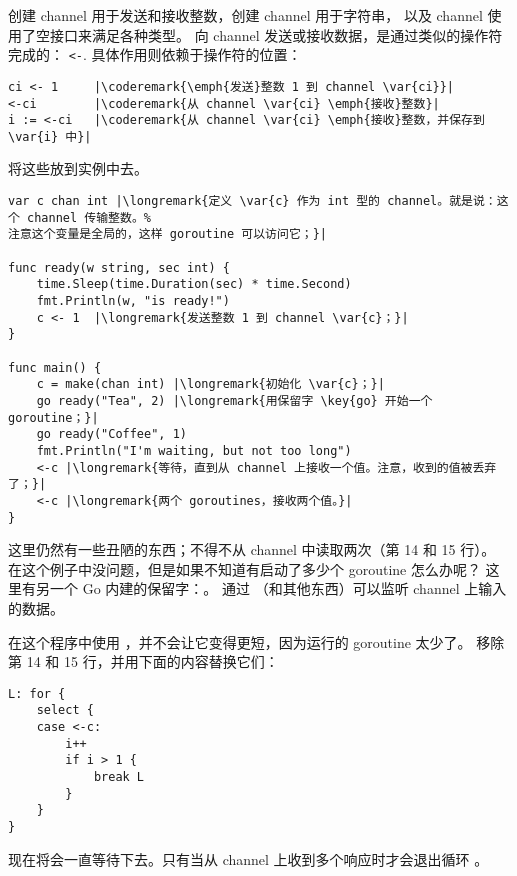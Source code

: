 创建 channel  用于发送和接收整数，创建 channel  用于字符串，
以及 channel  使用了空接口来满足各种类型。
向 channel 发送或接收数据，是通过类似的操作符完成的：
\lstinline{<-}. 
具体作用则依赖于操作符的位置：
\begin{lstlisting}
ci <- 1	    |\coderemark{\emph{发送}整数 1 到 channel \var{ci}}|
<-ci	    |\coderemark{从 channel \var{ci} \emph{接收}整数}|
i := <-ci   |\coderemark{从 channel \var{ci} \emph{接收}整数，并保存到 \var{i} 中}|
\end{lstlisting}
将这些放到实例中去。
\begin{lstlisting}[numbers=none,caption=Go routines 和 channel,label=src:sleeping with channels]
var c chan int |\longremark{定义 \var{c} 作为 int 型的 channel。就是说：这个 channel 传输整数。%
注意这个变量是全局的，这样 goroutine 可以访问它；}|

func ready(w string, sec int) {
	time.Sleep(time.Duration(sec) * time.Second)
	fmt.Println(w, "is ready!")
	c <- 1	|\longremark{发送整数 1 到 channel \var{c}；}|
}

func main() {
	c = make(chan int) |\longremark{初始化 \var{c}；}|
	go ready("Tea", 2) |\longremark{用保留字 \key{go} 开始一个 goroutine；}|
	go ready("Coffee", 1)
	fmt.Println("I'm waiting, but not too long")
	<-c |\longremark{等待，直到从 channel 上接收一个值。注意，收到的值被丢弃了；}|
	<-c |\longremark{两个 goroutines，接收两个值。}|
}
\end{lstlisting}

\showremarks
这里仍然有一些丑陋的东西；不得不从 channel 中读取两次（第 14 和 15 行）。
在这个例子中没问题，但是如果不知道有启动了多少个 goroutine 怎么办呢？
这里有另一个 Go 内建的保留字：。
通过 （和其他东西）可以监听 channel 上输入的数据。

在这个程序中使用 ，并不会让它变得更短，因为运行的 go\-routine 太少了。
移除第 14 和 15 行，并用下面的内容替换它们：
\begin{lstlisting}[caption=使用 select,numbers=right,firstnumber=14]
L: for {
	select {
	case <-c:
		i++ 
		if i > 1 { 
			break L
		}   
	}   
}   
\end{lstlisting}
现在将会一直等待下去。只有当从 channel  上收到多个响应时才会退出循环 。

